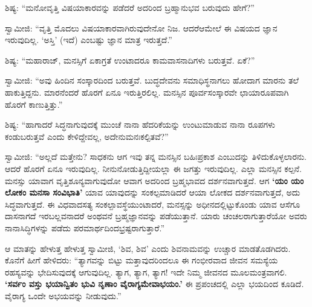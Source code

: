  ಶಿಷ್ಯ: “ಮನೋವೃತ್ತಿ ವಿಷಯಾಕಾರವನ್ನು ಪಡೆದರೆ ಅದರಿಂದ ಬ್ರಹ್ಮಾನುಭವ ಬರುವುದು ಹೇಗೆ?” 

 ಸ್ವಾಮೀಜಿ: “ವೃತ್ತಿ ಮೊದಲು ವಿಷಯಾಕಾರವಾಗಿರುವುದೇನೋ ನಿಜ. ಆದರೆ\break ಆಮೇಲೆ ಈ ವಿಷಯದ ಜ್ಞಾನ ಇರುವುದಿಲ್ಲ. ‘ಅಸ್ತಿ’ (ಇದೆ) ಎಂಬಷ್ಟು ಜ್ಞಾನ ಮಾತ್ರ ಇರುತ್ತದೆ.” 

 ಶಿಷ್ಯ: “ಮಹಾರಾಜ್, ಮನಸ್ಸಿಗೆ ಏಕಾಗ್ರತೆ ಉಂಟಾದರೂ ಕಾಮವಾಸನಾದಿಗಳು ಬರುತ್ತವೆ. ಏಕೆ?” 

 ಸ್ವಾಮೀಜಿ: “ಅವು ಹಿಂದಿನ ಸಂಸ್ಕಾರದಿಂದ ಬರುತ್ತವೆ. ಬುದ್ಧದೇವನು ಸಮಾಧಿಸ್ಥನಾಗಲು ಹೋದಾಗ ಮಾರನು ತಲೆ ಹಾಕುತ್ತಿದ್ದನು. ಮಾರನೆಂದರೆ ಹೊರಗೆ ಏನೂ ಇರುತ್ತಿರಲಿಲ್ಲ. ಮನಸ್ಸಿನ ಪೂರ್ವಸಂಸ್ಕಾರವೇ ಛಾಯಾರೂಪವಾಗಿ ಹೊರಗೆ ಕಾಣುತ್ತಿತ್ತು.” 

 ಶಿಷ್ಯ: “ಹಾಗಾದರೆ ಸಿದ್ಧನಾಗುವುದಕ್ಕೆ ಮುಂಚೆ ನಾನಾ ಹೆದರಿಕೆಯನ್ನು ಉಂಟುಮಾಡುವ ನಾನಾ ರೂಪಗಳು ಕಂಡುಬರುತ್ತವೆ ಎಂದು ಕೇಳಿದ್ದೇವಲ್ಲ, ಅದೇನು\break ಮನಃಕಲ್ಪಿತವೆ?” 

 ಸ್ವಾಮೀಜಿ: “ಅಲ್ಲದೆ ಮತ್ತೇನು? ಸಾಧಕನು ಆಗ ಇವು ತನ್ನ ಮನಸ್ಸಿನ ಬಹಿಃಪ್ರಕಾಶ ಎಂಬುದನ್ನು ತಿಳಿದುಕೊಳ್ಳಲಾರನು. ಆದರೆ ಹೊರಗೆ ಏನೂ ಇರುವುದಿಲ್ಲ. ನೀನು\break ನೋಡುತ್ತಿದ್ದೀಯಲ್ಲಾ ಈ ಜಗತ್ತು ಇರುವುದಿಲ್ಲ. ಎಲ್ಲಾ ಮನಸ್ಸಿನ ಕಲ್ಪನೆ. ಮನಸ್ಸು ಯಾವಾಗ ವೃತ್ತಿಶೂನ್ಯವಾಗುವುದೋ ಆವಾಗ ಅದರಿಂದ ಬ್ರಹ್ಮಭಾವದ ದರ್ಶನವಾಗುತ್ತದೆ. ಆಗ \textbf{‘ಯಂ ಯಂ ಲೋಕಂ ಮನಸಾ ಸಂವಿಭಾತಿ’} ಯಾವ ಯಾವುದನ್ನು ಸಂಕಲ್ಪಮಾಡಿದರೆ ಆಯಾ ಲೋಕದ ದರ್ಶನವಾಗುತ್ತದೆ, ಅದು ಸಿದ್ಧವಾಗುತ್ತದೆ. ಈ ವಿಧವಾದ\break ಸತ್ಯ ಸಂಕಲ್ಪಾವಸ್ಥೆಯುಂಟಾದರೆ, ಮನಸ್ಸನ್ನು ಅಧೀನದಲ್ಲಿಟ್ಟುಕೊಂಡು ಯಾವ ಆಸೆಗೂ ದಾಸನಾಗದೆ ಇರಬಲ್ಲವನಾದರೆ ಅಂಥವನೆ ಬ್ರಹ್ಮಜ್ಞಾನವನ್ನು ಪಡೆಯುತ್ತಾನೆ. ಯಾರು ಚಂಚಲರಾಗುತ್ತಾರೆಯೋ ಅವರು ನಾನಾಸಿದ್ಧಿಗಳನ್ನು ಪಡೆದು ಪರಮಾರ್ಥದಿಂದ\break ಭ್ರಷ್ಟರಾಗುತ್ತಾರೆ.” 

 ಆ ಮಾತನ್ನು ಹೇಳುತ್ತ ಹೇಳುತ್ತ ಸ್ವಾಮೀಜಿ, ‘ಶಿವ, ಶಿವ’ ಎಂದು ಶಿವನಾಮವನ್ನು ಉಚ್ಚಾರ ಮಾಡತೊಡಗಿದರು. ಕೊನೆಗೆ ಹೀಗೆ ಹೇಳಿದರು: “ತ್ಯಾಗವನ್ನು ಬಿಟ್ಟು ಮತ್ತಾವುದರಿಂದಲೂ ಈ ಗಂಭೀರವಾದ ಜೀವನ ಸಮಸ್ಯೆಯ ರಹಸ್ಯವನ್ನು ಭೇದಿಸುವುದಕ್ಕೆ ಆಗುವುದಿಲ್ಲ. ತ್ಯಾಗ, ತ್ಯಾಗ, ತ್ಯಾಗ! ಇದೇ ನಿಮ್ಮ ಜೀವನದ ಮೂಲಮಂತ್ರವಾಗಲಿ. \textbf{‘ಸರ್ವಂ ವಸ್ತು ಭಯಾನ್ವಿತಂ ಭುವಿ ನೃಣಾಂ ವೈರಾಗ್ಯಮೇವಾಭಯಂ.’} ಈ ಪ್ರಪಂಚದಲ್ಲಿ ಎಲ್ಲಾ ಭಯದಿಂದ ಕೂಡಿದೆ. ವೈರಾಗ್ಯ ಒಂದೇ ಅಭಯವನ್ನು ನೀಡುವುದು.” 

